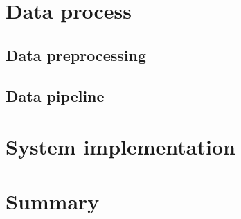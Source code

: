\documentclass[thesis.tex]{subfiles}
\begin{document}
\section{Data process} \label{data_pipeline}

\subsection{Data preprocessing}

\subsection{Data pipeline}


\section{System implementation} \label{systemimplementation}


\section{Summary} \label{03summary}
\end{document}
